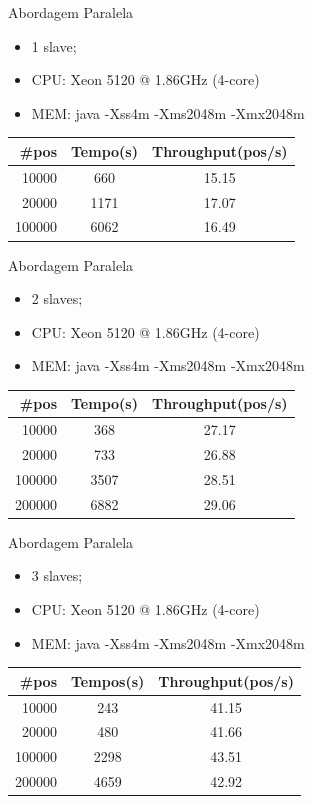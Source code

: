 \documentclass{beamer}
\begin{document}
	\begin{frame}{Abordagem Paralela}
		\begin{itemize}
			\item 1 slave; 
			\item CPU: Xeon 5120  @ 1.86GHz (4-core)
			\item MEM: java -Xss4m -Xms2048m -Xmx2048m
		\end{itemize}

		\begin{tabular}{| r | c | c |}
		  \hline
		  \#pos & Tempo(s) & Throughput(pos/s) \\
		  \hline			
		 10000 & 660 & 15.15 \\
		 20000 & 1171 & 17.07 \\
		 100000 & 6062 & 16.49 \\
		  \hline  
		\end{tabular}
	\end{frame}

	\begin{frame}{Abordagem Paralela}
		\begin{itemize}
			\item 2 slaves; 
			\item CPU: Xeon 5120  @ 1.86GHz (4-core)
			\item MEM: java -Xss4m -Xms2048m -Xmx2048m
		\end{itemize}

		\begin{tabular}{| r | c | c |}
		  \hline
		  \#pos & Tempo(s) & Throughput(pos/s) \\
		  \hline			
		 10000 & 368 & 27.17 \\
		 20000 & 733 & 26.88 \\
		 100000 & 3507 & 28.51 \\
		 200000 & 6882 & 29.06 \\
		  \hline  
		\end{tabular}
	\end{frame}

	\begin{frame}{Abordagem Paralela}
		\begin{itemize}
			\item 3 slaves; 
			\item CPU: Xeon 5120  @ 1.86GHz (4-core)
			\item MEM: java -Xss4m -Xms2048m -Xmx2048m
		\end{itemize}

		\begin{tabular}{| r | c | c |}
		  \hline
		  \#pos & Tempos(s) & Throughput(pos/s) \\
		  \hline			
		 10000 & 243 & 41.15 \\
		 20000 & 480 & 41.66 \\
		 100000 & 2298 & 43.51 \\
		 200000 & 4659 & 42.92 \\
		  \hline  
		\end{tabular}
	\end{frame}
	
\end{document}
